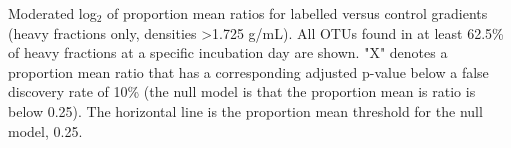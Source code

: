 Moderated log$_{2}$ of proportion mean ratios for labelled versus control gradients (heavy fractions only, densities >1.725 g/mL). All OTUs found in at least 62.5\% of heavy fractions at a specific incubation day are shown. "X" denotes a proportion mean ratio that has a corresponding adjusted p-value below a false discovery rate of 10\% (the null model is that the proportion mean is ratio is below 0.25). The horizontal line is the proportion mean threshold for the null model, 0.25. 